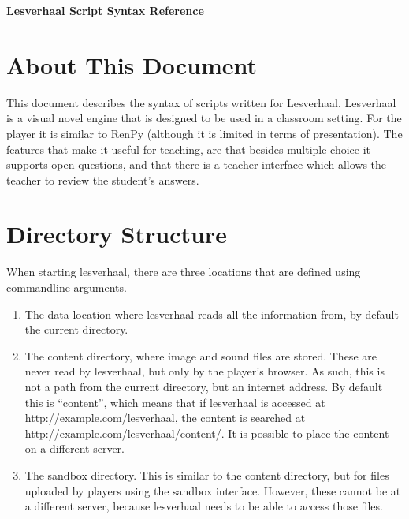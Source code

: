 \documentclass{article}
\begin{document}
\noindent\textbf{\Large Lesverhaal Script Syntax Reference}

\tableofcontents

\tableofcontents

\section{About This Document}
This document describes the syntax of scripts written for Lesverhaal.
Lesverhaal is a visual novel engine that is designed to be used in a classroom
setting. For the player it is similar to RenPy (although it is limited in terms
of presentation). The features that make it useful for teaching, are that
besides multiple choice it supports open questions, and that there is a teacher
interface which allows the teacher to review the student's answers.

\section{Directory Structure}
When starting lesverhaal, there are three locations that are defined using
commandline arguments.
\begin{enumerate}
	\item The data location where lesverhaal reads all the information
		from, by default the current directory. 

	\item The content directory, where image and sound files are stored.
		These are never read by lesverhaal, but only by the player's
		browser. As such, this is not a path from the current
		directory, but an internet address. By default this is
		``content'', which means that if lesverhaal is accessed at
		http://example.com/lesverhaal, the content is searched at
		http://example.com/lesverhaal/content/. It is possible to place
		the content on a different server.

	\item The sandbox directory. This is similar to the content directory,
		but for files uploaded by players using the sandbox interface.
		However, these cannot be at a different server, because
		lesverhaal needs to be able to access those files.
\end{enumerate}
\end{document}
